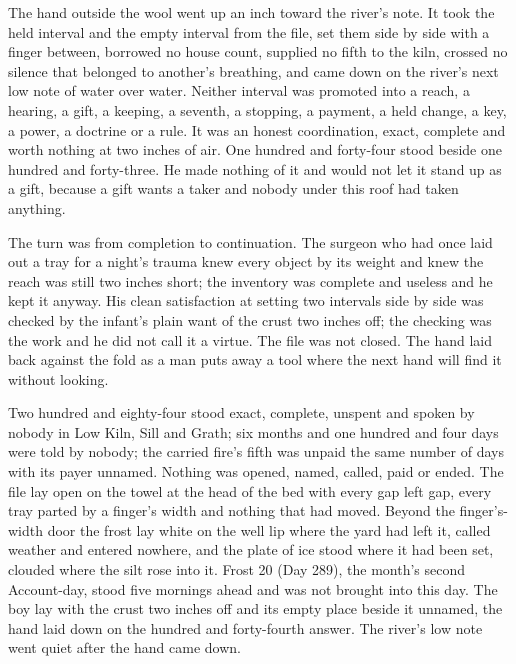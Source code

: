 The hand outside the wool went up an inch toward the river's note. It took the held interval and the empty interval from the file, set them side by side with a finger between, borrowed no house count, supplied no fifth to the kiln, crossed no silence that belonged to another's breathing, and came down on the river's next low note of water over water. Neither interval was promoted into a reach, a hearing, a gift, a keeping, a seventh, a stopping, a payment, a held change, a key, a power, a doctrine or a rule. It was an honest coordination, exact, complete and worth nothing at two inches of air. One hundred and forty-four stood beside one hundred and forty-three. He made nothing of it and would not let it stand up as a gift, because a gift wants a taker and nobody under this roof had taken anything.

The turn was from completion to continuation. The surgeon who had once laid out a tray for a night's trauma knew every object by its weight and knew the reach was still two inches short; the inventory was complete and useless and he kept it anyway. His clean satisfaction at setting two intervals side by side was checked by the infant's plain want of the crust two inches off; the checking was the work and he did not call it a virtue. The file was not closed. The hand laid back against the fold as a man puts away a tool where the next hand will find it without looking.

Two hundred and eighty-four stood exact, complete, unspent and spoken by nobody in Low Kiln, Sill and Grath; six months and one hundred and four days were told by nobody; the carried fire's fifth was unpaid the same number of days with its payer unnamed. Nothing was opened, named, called, paid or ended. The file lay open on the towel at the head of the bed with every gap left gap, every tray parted by a finger's width and nothing that had moved. Beyond the finger's-width door the frost lay white on the well lip where the yard had left it, called weather and entered nowhere, and the plate of ice stood where it had been set, clouded where the silt rose into it. Frost 20 (Day 289), the month's second Account-day, stood five mornings ahead and was not brought into this day. The boy lay with the crust two inches off and its empty place beside it unnamed, the hand laid down on the hundred and forty-fourth answer. The river's low note went quiet after the hand came down.
